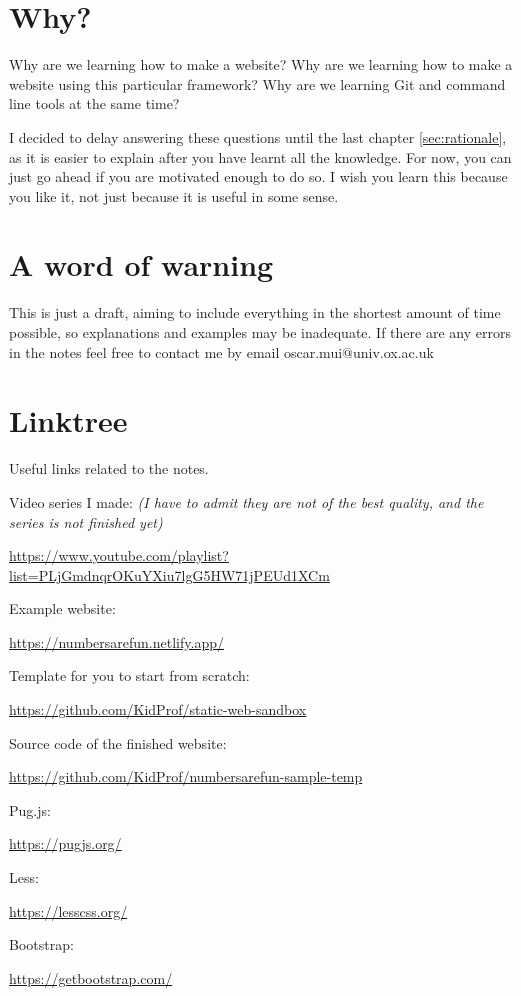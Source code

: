 \section{Why?}

Why are we learning how to make a website? Why are we learning how to make a website using this particular framework? Why are we learning Git and command line tools at the same time?

I decided to delay answering these questions until the last chapter \cref{sec:rationale}, as it is easier to explain after you have learnt all the knowledge. For now, you can just go ahead if you are motivated enough to do so. I wish you learn this because you like it, not just because it is useful in some sense.

\section{A word of warning}

This is just a draft, aiming to include everything in the shortest amount of time possible, so explanations and examples may be inadequate. If there are any errors in the notes feel free to contact me by email oscar.mui@univ.ox.ac.uk

\section{Linktree}

Useful links related to the notes.
\vspace{6mm}

Video series I made: \textit{(I have to admit they are not of the best quality, and the series is not finished yet)}

\url{https://www.youtube.com/playlist?list=PLjGmdnqrOKuYXiu7lgG5HW71jPEUd1XCm}
\vspace{6mm}

Example website:

\url{https://numbersarefun.netlify.app/}
\vspace{6mm}

Template for you to start from scratch:

\url{https://github.com/KidProf/static-web-sandbox}
\vspace{6mm}

Source code of the finished website:

\url{https://github.com/KidProf/numbersarefun-sample-temp}
\vspace{6mm}

Pug.js: 

\url{https://pugjs.org/}
\vspace{6mm}

Less: 

\url{https://lesscss.org/}
\vspace{6mm}

Bootstrap: 

\url{https://getbootstrap.com/}
\vspace{6mm}

